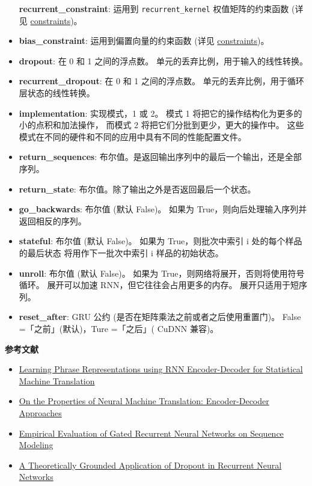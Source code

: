 \begin{itemize}
  \textbf{recurrent\_constraint}: 运用到 \texttt{recurrent\_kernel}
  权值矩阵的约束函数 (详见 \hyperref[constraints]{constraints})。
\item
  \textbf{bias\_constraint}: 运用到偏置向量的约束函数 (详见
  \hyperref[constraints]{constraints})。
\item
  \textbf{dropout}: 在 0 和 1 之间的浮点数。
  单元的丢弃比例，用于输入的线性转换。
\item
  \textbf{recurrent\_dropout}: 在 0 和 1 之间的浮点数。
  单元的丢弃比例，用于循环层状态的线性转换。
\item
  \textbf{implementation}: 实现模式，1 或 2。 模式 1
  将把它的操作结构化为更多的小的点积和加法操作， 而模式 2
  将把它们分批到更少，更大的操作中。
  这些模式在不同的硬件和不同的应用中具有不同的性能配置文件。
\item
  \textbf{return\_sequences}:
  布尔值。是返回输出序列中的最后一个输出，还是全部序列。
\item
  \textbf{return\_state}: 布尔值。除了输出之外是否返回最后一个状态。
\item
  \textbf{go\_backwards}: 布尔值 (默认 False)。 如果为
  True，则向后处理输入序列并返回相反的序列。
\item
  \textbf{stateful}: 布尔值 (默认 False)。 如果为 True，则批次中索引 i
  处的每个样品的最后状态 将用作下一批次中索引 i 样品的初始状态。
\item
  \textbf{unroll}: 布尔值 (默认 False)。 如果为
  True，则网络将展开，否则将使用符号循环。 展开可以加速
  RNN，但它往往会占用更多的内存。 展开只适用于短序列。
\item
  \textbf{reset\_after}: GRU 公约
  (是否在矩阵乘法之前或者之后使用重置门)。 False =「之前」(默认)，Ture
  =「之后」( CuDNN 兼容)。
\end{itemize}

\textbf{参考文献}

\begin{itemize}
\tightlist
\item
  \href{https://arxiv.org/abs/1406.1078}{Learning Phrase Representations
  using RNN Encoder-Decoder for Statistical Machine Translation}
\item
  \href{https://arxiv.org/abs/1409.1259}{On the Properties of Neural
  Machine Translation: Encoder-Decoder Approaches}
\item
  \href{http://arxiv.org/abs/1412.3555v1}{Empirical Evaluation of Gated
  Recurrent Neural Networks on Sequence Modeling}
\item
  \href{http://arxiv.org/abs/1512.05287}{A Theoretically Grounded
  Application of Dropout in Recurrent Neural Networks}
\end{itemize}




